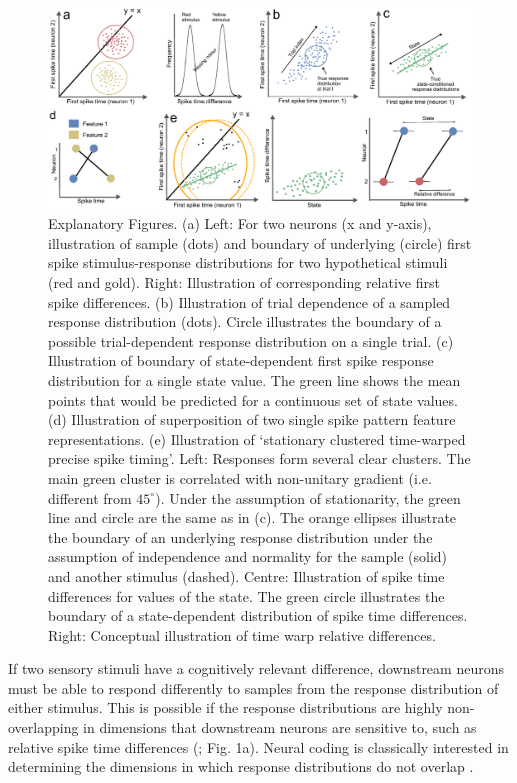 \documentclass{article}
\begin{document}
\begin{figure}[t!]
\centering
\includegraphics[width=\textwidth]{Figure1.pdf}
\caption{Explanatory Figures. 
(a) Left: For two neurons (x and y-axis), illustration of sample (dots) and boundary of underlying (circle) first spike stimulus-response distributions for two hypothetical stimuli (red and gold). Right: Illustration of corresponding relative first spike differences. 
(b) Illustration of trial dependence of a sampled response distribution (dots). Circle illustrates the boundary of a possible trial-dependent response distribution on a single trial. 
(c) Illustration of boundary of state-dependent first spike response distribution for a single state value. The green line shows the mean points that would be predicted for a continuous set of state values.
(d) Illustration of superposition of two single spike pattern feature representations.
(e) Illustration of `stationary clustered time-warped precise spike timing'. Left: Responses form several clear clusters. The main green cluster is correlated with non-unitary gradient (i.e. different from $45^{\circ}$). Under the assumption of stationarity, the green line and circle are the same as in (c). The orange ellipses illustrate the boundary of an underlying response distribution under the assumption of independence and normality for the sample (solid) and another stimulus (dashed). Centre: Illustration of spike time differences for values of the state. The green circle illustrates the boundary of a state-dependent distribution of spike time differences. Right: Conceptual illustration of time warp relative differences.}
\label{fig:fig1}
\end{figure}

If two sensory stimuli have a cognitively relevant difference, downstream neurons must be able to respond differently to samples from the response distribution of either stimulus. This is possible if the response distributions are highly non-overlapping in dimensions that downstream neurons are sensitive to, such as relative spike time differences (\cite{gasparini2006state, branco2010dendritic, branco2011synaptic}; Fig. 1a). Neural coding is classically interested in determining the dimensions in which response distributions do not overlap \cite{averbeck2006neural}.
\end{document}
